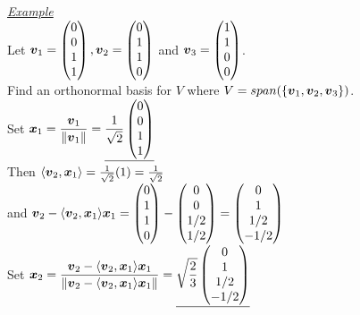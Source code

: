 \documentclass[11pt,a4paper]{article}
\begin{document}
\underline{\textit{Example}}\\
Let $\boldsymbol{v}_1 = \begin{pmatrix} 0 \\ 0 \\ 1 \\ 1 \end{pmatrix}, \boldsymbol{v}_2 = \begin{pmatrix} 0 \\ 1 \\ 1 \\ 0 \end{pmatrix}$ and $\boldsymbol{v}_3 = \begin{pmatrix} 1 \\ 1 \\ 0 \\ 0 \end{pmatrix}$.\\
Find an orthonormal basis for $V$ where $V = span(\{\boldsymbol{v}_1, \boldsymbol{v}_2, \boldsymbol{v}_3\})$.\\
Set $\displaystyle{\boldsymbol{x}_1  = \frac{\boldsymbol{v}_1}{\|\boldsymbol{v}_1\|} = \underline{\frac{1}{\sqrt{2}}\begin{pmatrix} 0 \\ 0 \\ 1 \\ 1 \end{pmatrix}}}$\\
Then $\langle \boldsymbol{v}_2, \boldsymbol{x}_1 \rangle = \frac{1}{\sqrt{2}}(1) = \frac{1}{\sqrt{2}}$\\
and $\boldsymbol{v}_2 - \langle \boldsymbol{v}_2, \boldsymbol{x}_1 \rangle\boldsymbol{x}_1 = \begin{pmatrix} 0 \\ 1 \\ 1 \\ 0 \end{pmatrix} - \begin{pmatrix} 0 \\ 0 \\ 1/2 \\ 1/2 \end{pmatrix} = \begin{pmatrix} 0 \\ 1 \\ 1/2 \\ -1/2 \end{pmatrix}$\\
Set $\displaystyle{\boldsymbol{x}_2 = \frac{\boldsymbol{v}_2 - \langle \boldsymbol{v}_2, \boldsymbol{x}_1 \rangle\boldsymbol{x}_1}{\|\boldsymbol{v}_2 - \langle \boldsymbol{v}_2, \boldsymbol{x}_1 \rangle\boldsymbol{x}_1\|} =\underline{\sqrt{\frac{2}{3}} \begin{pmatrix} 0 \\ 1 \\ 1/2 \\ -1/2 \end{pmatrix}}}$\\
\end{document}
